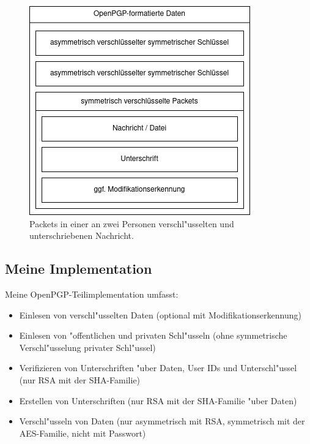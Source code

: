 \documentclass[12pt]{article}
\begin{document}
\begin{figure}
    \centering
    \includegraphics[height=0.3\textheight]{example_openpgp_format.png}
    \caption{Packets in einer an zwei Personen verschl"usselten und unterschriebenen Nachricht.}
    \label{fig:example_openpgp_format}
\end{figure}

\subsection{Meine Implementation}

Meine OpenPGP-Teilimplementation umfasst:
\begin{itemize}
    \item Einlesen von verschl"usselten Daten (optional mit Modifikationserkennung)
    \item Einlesen von "offentlichen und privaten Schl"usseln (ohne symmetrische Verschl"usselung privater Schl"ussel)
    \item Verifizieren von Unterschriften "uber Daten, User IDs und Unterschl"ussel (nur RSA mit der SHA-Familie)
    \item Erstellen von Unterschriften (nur RSA mit der SHA-Familie "uber Daten)
    \item Verschl"usseln von Daten (nur asymmetrisch mit RSA, symmetrisch mit der AES-Familie, nicht mit Passwort)
\end{itemize}
\end{document}
